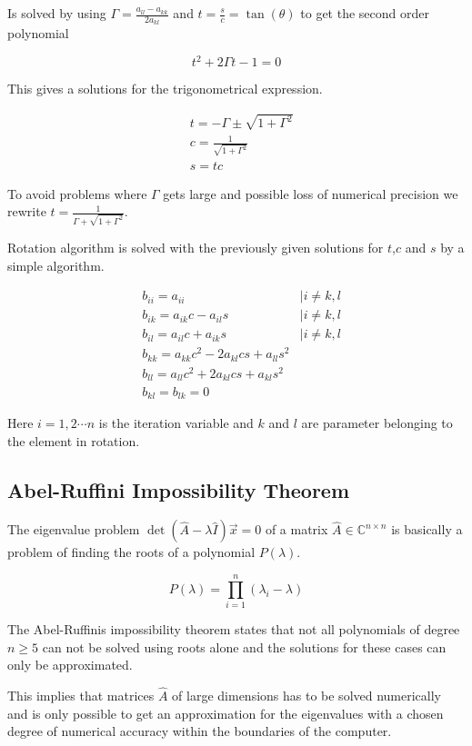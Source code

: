 \documentclass[twoside,twocolumn]{article}
\newcommand{\nl}{
	
	\medskip
	\noindent
}
\begin{document}
	
	\noindent
	Is solved by using $\Gamma = \frac{a_{ll} - a_{kk}}{2a_{kl}}$ and $t = \frac{s}{c}= \tan(\theta)$ to get the second order polynomial
	
	\begin{equation*}
		t^2 + 2\Gamma t-1 = 0
	\end{equation*}
	
	This gives a solutions for the trigonometrical expression.
	
	\begin{align*}
	&t = -\Gamma\pm \sqrt{1+\Gamma^2}\\
	&c = \frac{1}{\sqrt{1 + \Gamma^2}}\\
	&s = tc
	\end{align*}
	
	To avoid problems where $\Gamma$ gets large and possible loss of numerical precision we rewrite $t = \frac{1}{\Gamma + \sqrt{1+\Gamma^2}}$.
	\nl
	Rotation algorithm is solved with the previously given solutions for $t$,$c$ and $s$ by a simple algorithm. 
	
	\begin{align*}
	&b_{ii} = a_{ii} &|i\neq k,l\\
	&b_{ik} = a_{ik}c - a_{il}s &|i\neq k,l\\
	&b_{il} = a_{il}c + a_{ik}s &|i\neq k,l\\
	&b_{kk} = a_{kk}c^2 - 2a_{kl}cs + a_{ll}s^2&\\
	&b_{ll} = a_{ll}c^2 + 2a_{kl}cs + a_{kl}s^2&\\
	&b_{kl} = b_{lk} = 0&
	\end{align*}
	
	\noindent
	
	Here $i = 1,2\cdots n$ is the iteration variable and $k$ and $l$ are parameter belonging to the element in rotation.
	
	\subsection{Abel-Ruffini Impossibility Theorem}
	
	The eigenvalue problem $\det(\hat{A}-\lambda \hat{I})\vec{x} = 0$ of a matrix $\hat{A}\in \mathbb{C}^{n\times n}$ is basically a problem of finding the roots of a polynomial $P(\lambda)$. 
	
	\begin{equation*}
	P(\lambda) = \prod_{i=1}^n(\lambda_i - \lambda)
	\end{equation*}
	
	\noindent
	The Abel-Ruffinis impossibility theorem states that not all polynomials of degree $n\geq 5$ can not be solved using roots alone and the solutions for these cases can only be approximated. \citep{compfys}
	\nl
	This implies that matrices $\hat{A}$ of large dimensions has to be solved numerically and is only possible to get an approximation for the eigenvalues with a chosen degree of numerical accuracy within the boundaries of the computer.
	
\end{document}
